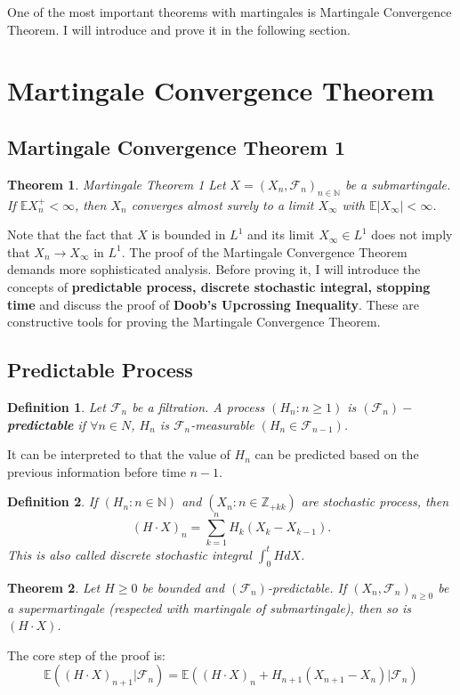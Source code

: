\documentclass[10pt]{article}
\newtheorem{theorem}{Theorem}
\newtheorem{definition}{Definition}
\begin{document}
One of the most important theorems with martingales is Martingale Convergence Theorem. I will introduce and prove it in the following section.
\section{Martingale Convergence Theorem}
\subsection{Martingale Convergence Theorem 1} \cite{Bloem-Reddy:2019}
\begin{theorem}{Martingale Theorem 1}
Let $X=(X_n,\mathcal{F}_n)_{n \in \mathbb{N}}$ be a submartingale. If  $\mathbb{E}X_n^{+}<\infty$, then $X_n$ converges almost surely to a limit $X_{\infty}$ with $\mathbb{E}|X_{\infty}|<\infty$.
\end{theorem}
Note that the fact that $X$ is bounded in $L^1$ and its limit $X_{\infty} \in L^1$ does not imply that $X_n \to X_{\infty}$ in $L^1$.
The proof of the Martingale Convergence Theorem demands more sophisticated analysis. 
Before proving it, I will introduce the concepts of \textbf{predictable process, discrete stochastic integral, stopping time } and discuss the proof of \textbf{Doob's Upcrossing Inequality}. These are constructive tools for proving the Martingale Convergence Theorem.
\subsection{Predictable Process}
\begin{definition}
Let $\mathcal{F}_n$ be a filtration. A process $(H_n: n\ge 1)$ is $(\mathcal{F}_n)-$ \textbf{predictable} if $\forall n \in N$, $H_n$ is $\mathcal{F}_n$-measurable $(H_n \in \mathcal{F}_{n-1})$. 
\end{definition}
It can be interpreted to that the value of $H_n$ can be predicted based on the previous information before time $n-1$.
\begin{definition}
If $(H_n: n \in \mathbb{N})$ and $(X_n: n \in \mathbb{Z}_{+kk})$ are stochastic process, then $$(H \cdot X)_n = \sum_{k=1}^{n}H_k(X_k-X_{k-1}).$$ This is also called discrete stochastic integral $\int_{0}^{t}H dX$.
\end{definition}
\begin{theorem}
Let $H\ge 0$ be bounded  and $(\mathcal{F}_n)$-predictable. 
If $(X_n, \mathcal{F}_n)_{n \ge 0}$ be a supermartingale (respected with martingale of submartingale), then so is $(H \cdot X)$.
\end{theorem}
The core step of the proof is: 
$$\mathbb{E}((H\cdot X)_{n+1}|\mathcal{F}_n)=\mathbb{E}((H\cdot X)_{n}+H_{n+1}(X_{n+1}-X_{n})|\mathcal{F}_n)$$
\end{document}

